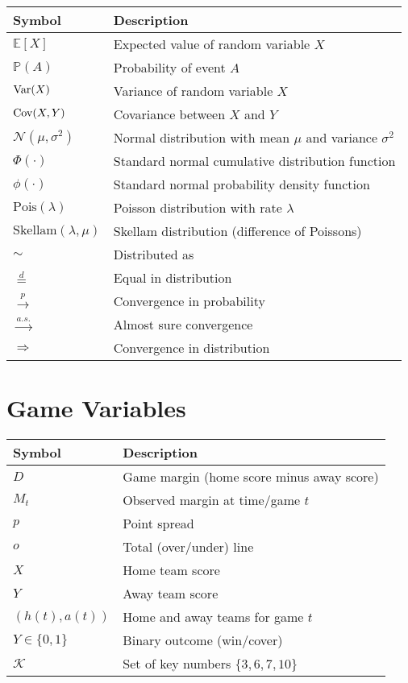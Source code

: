 \begin{tabular}{ll}
\toprule
\textbf{Symbol}  & \textbf{Description} \\
\midrule
$\mathbb{E}[X]$ & Expected value of random variable $X$ \\
$\mathbb{P}(A)$ & Probability of event $A$ \\
$\mathrm{Var}(X)$ & Variance of random variable $X$ \\
$\mathrm{Cov}(X,Y)$ & Covariance between $X$ and $Y$ \\
$\mathcal{N}(\mu, \sigma^2)$ & Normal distribution with mean $\mu$ and variance $\sigma^2$ \\
$\Phi(\cdot)$ & Standard normal cumulative distribution function \\
$\phi(\cdot)$ & Standard normal probability density function \\
$\text{Pois}(\lambda)$ & Poisson distribution with rate $\lambda$ \\
$\text{Skellam}(\lambda, \mu)$ & Skellam distribution (difference of Poissons) \\
$\sim$ & Distributed as \\
$\overset{d}{=}$ & Equal in distribution \\
$\overset{p}{\to}$ & Convergence in probability \\
$\overset{a.s.}{\to}$ & Almost sure convergence \\
$\Rightarrow$ & Convergence in distribution \\
\bottomrule
\end{tabular}

\section*{Game Variables}

\begin{tabular}{ll}
\toprule
\textbf{Symbol}  & \textbf{Description} \\
\midrule
$D$ & Game margin (home score minus away score) \\
$M_t$ & Observed margin at time/game $t$ \\
$p$ & Point spread \\
$o$ & Total (over/under) line \\
$X$ & Home team score \\
$Y$ & Away team score \\
$(h(t), a(t))$ & Home and away teams for game $t$ \\
$Y \in \{0,1\}$ & Binary outcome (win/cover) \\
$\mathcal{K}$ & Set of key numbers $\{3, 6, 7, 10\}$ \\
\bottomrule
\end{tabular}

